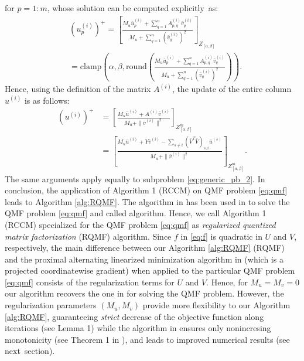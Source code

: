\documentclass[lettersize,journal]{IEEEtran}
\begin{document}
for $p\!=\!1\!:\!m$, whose solution can  be  computed explicitly~as:
\begin{align}
\label{eq:explicit}
& (u^{(i)}_p)^+ =\left[   \frac{M_u \bar{u}^{(i)}_p + \sum_{q=1}^{n}A_{p,q}^{(i)} \bar v^{(i)}_q}{ M_u + \sum_{q=1}^{n}(\bar v^{(i)}_q)^2 }  \right]_{Z_{[\alpha, \beta]}}\\
&= \text{clamp} \!\left( \alpha, \beta, \text{round} \left(  \frac{M_u \bar{u}^{(i)}_p + \sum_{q=1}^{n}A_{p,q}^{(i)} \bar v^{(i)}_q}{M_u + \sum_{q=1}^{n}(\bar v^{(i)}_q)^2 }  \right ) \!\right ) .  \nonumber
\end{align} 
Hence, using the definition of the matrix $A^{(i)}$, the update of the entire column $u^{(i)}$ is as follows:
\begin{align*}  (u^{(i)})^{+} & =  \left[   \frac{M_u \bar{u}^{(i)} + A^{(i)} \bar v^{(i)}}{ M_u + \|\bar v^{(i)}\|^2}  \right]_{Z^m_{[\alpha, \beta]}} \\
& =  \left[   \frac{M_u \bar{u}^{(i)} + Y \bar v^{(i)} - \sum_{s \neq i }  (\bar V^T \bar V)_{s,i} \bar{u}^{(s)}  } { M_u + \|\bar v^{(i)}\|^2 }  \right]_{Z^m_{[\alpha, \beta]}}.    
\end{align*}
The same arguments apply equally to subproblem \eqref{eq:generic_pb_2}.  In conclusion, the application of Algorithm 1 (RCCM)  on  QMF problem \eqref{eq:qmf} leads to   Algorithm \ref{alg:RQMF}. The algorithm in \cite{Teb:14} has been used in \cite{qmf} to solve the QMF   problem \eqref{eq:qmf} and called  algorithm. Hence, we call Algorithm 1 (RCCM) specialized for the  QMF problem \eqref{eq:qmf} as \textit{regularized quantized matrix factorization}  (RQMF) algorithm.  Since $f$ in \eqref{eq:f} is quadratic in $U$ and $V$, respectively,  the main difference between our Algorithm \ref{alg:RQMF} (RQMF) and the proximal alternating  linearized minimization algorithm in \cite{Teb:14} (which is a projected coordinatewise gradient) when applied to the particular QMF problem \eqref{eq:qmf} consists of the regularization terms for $U$ and $V$. Hence, for $M_u=M_v =0$ our algorithm recovers the one in  \cite{Teb:14} for solving the QMF problem. However, the regularization parameters $(M_u,M_v)$ provide  more flexibility to our Algorithm \ref{alg:RQMF}, guaranteeing \textit{strict} decrease of the objective function along iterations (see Lemma 1) while  the algorithm in \cite{Teb:14} ensures only nonincresing monotonicity (see Theorem 1 in \cite{qmf}), and leads to improved numerical results (see next~section). 
\end{document}
